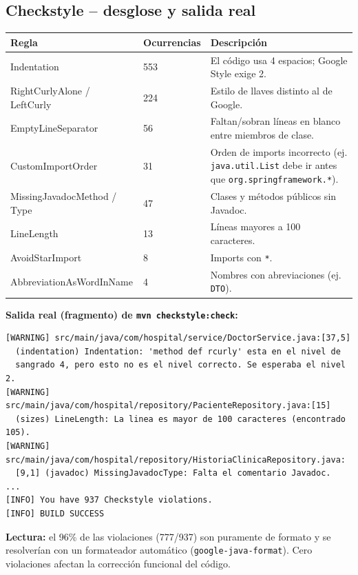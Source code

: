 \documentclass[11pt,a4paper]{article}
\begin{document}
\subsection{Checkstyle -- desglose y salida real}

\begin{longtable}{@{}p{5cm}p{2cm}p{7cm}@{}}
\toprule
\textbf{Regla} & \textbf{Ocurrencias} & \textbf{Descripci\'on} \\
\midrule
\endhead
Indentation & 553 & El c\'odigo usa 4 espacios; Google Style exige 2. \\
RightCurlyAlone / LeftCurly & 224 & Estilo de llaves distinto al de Google. \\
EmptyLineSeparator & 56 & Faltan/sobran l\'ineas en blanco entre miembros de clase. \\
CustomImportOrder & 31 & Orden de imports incorrecto (ej. \texttt{java.util.List}
  debe ir antes que \texttt{org.springframework.*}). \\
MissingJavadocMethod / Type & 47 & Clases y m\'etodos p\'ublicos sin Javadoc. \\
LineLength & 13 & L\'ineas mayores a 100 caracteres. \\
AvoidStarImport & 8 & Imports con \texttt{*}. \\
AbbreviationAsWordInName & 4 & Nombres con abreviaciones (ej. \texttt{DTO}). \\
\bottomrule
\end{longtable}

\textbf{Salida real (fragmento) de \texttt{mvn checkstyle:check}:}
\begin{lstlisting}
[WARNING] src/main/java/com/hospital/service/DoctorService.java:[37,5]
  (indentation) Indentation: 'method def rcurly' esta en el nivel de
  sangrado 4, pero esto no es el nivel correcto. Se esperaba el nivel 2.
[WARNING] src/main/java/com/hospital/repository/PacienteRepository.java:[15]
  (sizes) LineLength: La linea es mayor de 100 caracteres (encontrado 105).
[WARNING] src/main/java/com/hospital/repository/HistoriaClinicaRepository.java:
  [9,1] (javadoc) MissingJavadocType: Falta el comentario Javadoc.
...
[INFO] You have 937 Checkstyle violations.
[INFO] BUILD SUCCESS
\end{lstlisting}

\textbf{Lectura:} el 96\% de las violaciones (777/937) son puramente de
formato y se resolver\'ian con un formateador autom\'atico
(\texttt{google-java-format}). Cero violaciones afectan la correcci\'on
funcional del c\'odigo.
\end{document}
